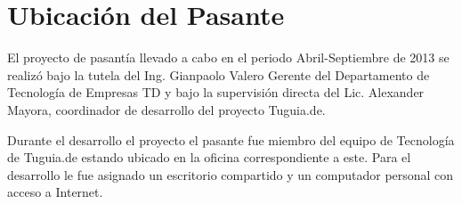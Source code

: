 \section{Ubicación del Pasante} \label{sect:ubicacion_pasante}

El proyecto de pasantía llevado a cabo en el periodo Abril-Septiembre de 2013 se
realizó bajo la tutela del Ing. Gianpaolo Valero Gerente del Departamento de Tecnología
de Empresas TD y bajo la supervisión directa del Lic. Alexander Mayora, coordinador de desarrollo del proyecto Tuguia.de. 

Durante el desarrollo el proyecto el pasante fue miembro del equipo de Tecnología de 
Tuguia.de estando ubicado en la oficina correspondiente a este. Para el desarrollo 
le fue asignado un escritorio compartido y un computador personal con acceso a Internet.
